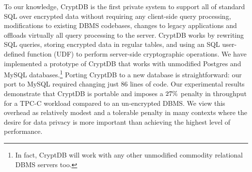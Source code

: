 To our knowledge, CryptDB is the first private system to support all of 
standard SQL over encrypted data without requiring any
client-side query processing, modifications to existing DBMS
codebases, changes to legacy applications and offloads virtually all
query processing to the server. CryptDB works by rewriting SQL queries,
storing encrypted data in regular tables, and using an SQL user-defined function (UDF) to perform server-side
cryptographic operations.  We have implemented a prototype of CryptDB
that works with unmodified Postgres and MySQL databases.\footnote{In
  fact, CryptDB will work with any other unmodified commodity
  relational DBMS servers too.}  Porting CryptDB to a new database is
straightforward: our port to MySQL required changing just $86$ lines of
code.  Our experimental results demonstrate that CryptDB is portable
and imposes a $27\%$ penalty in throughput for a TPC-C workload compared
to an un-encrypted DBMS\@.  We view this overhead as relatively modest
and a tolerable penalty in many contexts where the desire for data
privacy is more important than achieving the highest level of
performance.


